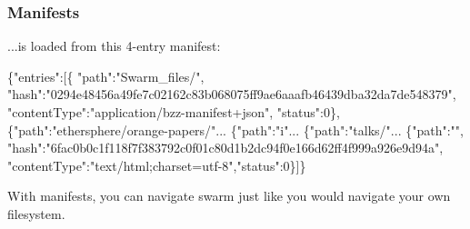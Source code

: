 \begin{frame}[fragile]
\frametitle{Manifests}
 ...is loaded from this 4-entry manifest:\\
\tiny
\begin{semiverbatim}
\{"entries":[\{
"path":"Swarm_files/",
"hash":"0294e48456a49fe7c02162c83b068075ff9ae6aaafb46439dba32da7de548379",
"contentType":"application/bzz-manifest+json",
"status":0\},
\{"path":"ethersphere/orange-papers/"...
\{"path":"i"...
\{"path":"talks/"...
\{"path":"",
"hash":"6fac0b0c1f118f7f383792c0f01c80d1b2dc94f0e166d62ff4f999a926e9d94a",
"contentType":"text/html;charset=utf-8","status":0\}]\}\end{semiverbatim}
\end{frame}

 \begin{frame}
  With manifests, you can navigate swarm just like you would navigate your own filesystem.\\
 \end{frame}



